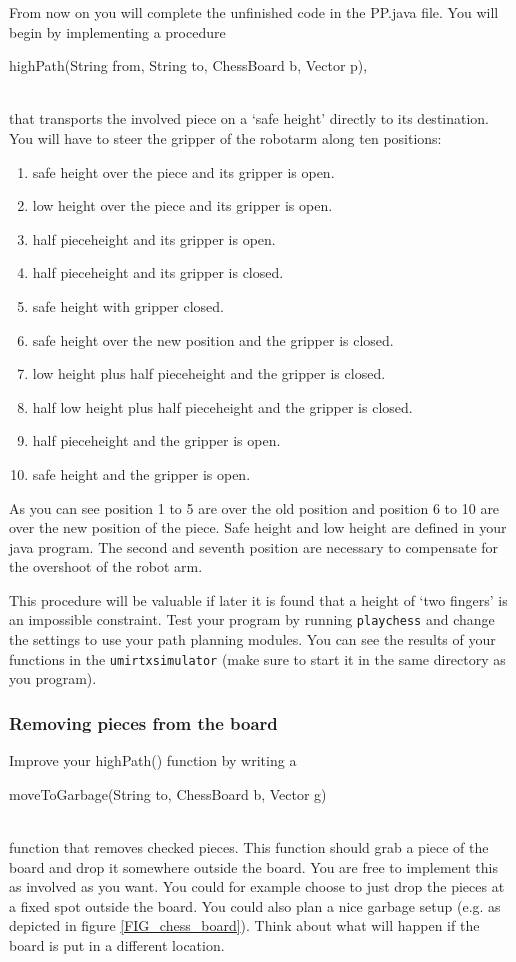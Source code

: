 \documentclass[10pt]{scrartcl}
\begin{document}
From now on you will complete the unfinished code in the {\ttfamily\small PP.java} file.
You will begin by implementing a procedure\\
\centerline{\ttfamily\small highPath(String from, String to,
ChessBoard b, Vector p),}\\
that transports the involved piece on a `safe height' directly to its
destination. You will have to steer the gripper of the robotarm along
ten positions:
\begin{enumerate}
\addtolength{\itemsep}{-.2cm}
  \item safe height over the piece and its gripper is open.
  \item low height over the piece and its gripper is open.
  \item half pieceheight and its gripper is open.
  \item half pieceheight and its gripper is closed.
  \item safe height with gripper closed.
  \item safe height over the new position and the gripper is closed.
  \item low height plus half pieceheight and the gripper is closed.
  \item half low height plus half pieceheight and the gripper is closed.
  \item half pieceheight and the gripper is open.
  \item safe height and the gripper is open.
\end{enumerate}
As you can see position 1 to 5 are over the old position and position
6 to 10 are over the new position of the piece. Safe height and low
height are defined in your java program. The second and seventh
position are necessary to compensate for the overshoot of the robot
arm.

This procedure will be valuable if later it is found that a height of
`two fingers' is an impossible constraint. Test your program by
running {\tt playchess} and change the settings to use your path
planning modules. You can see the results of your functions in the
{\tt umirtxsimulator} (make sure to start it in the same directory as
you program).

\subsubsection{Removing pieces from the board}
Improve your {\ttfamily\small highPath()} function by writing a
\\\centerline{\ttfamily\small moveToGarbage(String to, ChessBoard b, Vector g)}
\\function that removes checked pieces. This function should grab a
piece of the board and drop it somewhere outside the board. You are
free to implement this as involved as you want. You could for example
choose to just drop the pieces at a fixed spot outside the board. You
could also plan a nice garbage setup (e.g. as depicted in figure
\ref{FIG_chess_board}). Think about what will happen if the board is put
in a different location.
\end{document}
